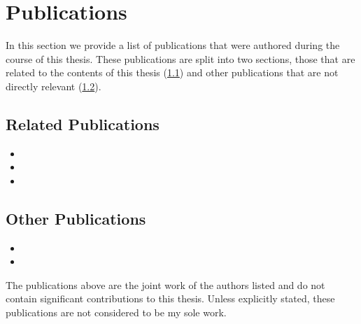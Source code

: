 \section{Publications}\label{sec:intro_pubs}
In this section we provide a list of publications that were authored during the
course of this thesis. These publications are split into two sections, those
that are related to the contents of this thesis 
(\cref{subsec:intro_rel_pubs}) and other publications that 
are not directly relevant (\cref{subsec:intro_other_pubs}).
\subsection{Related Publications}\label{subsec:intro_rel_pubs}
\begin{itemize}
	\item{}
	\item{}
	\item{}
\end{itemize}
\subsection{Other Publications}\label{subsec:intro_other_pubs}
\begin{itemize}
	\item{}
	\item{}
\end{itemize}
The publications above are the joint work of the authors listed and do not
contain significant contributions to this thesis. Unless explicitly stated,
these publications are not considered to be my sole work.
